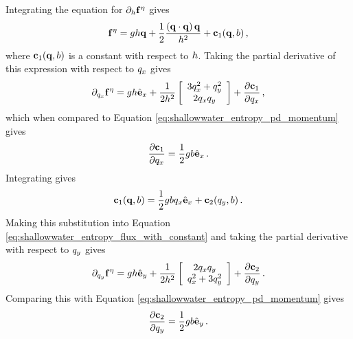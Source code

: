Integrating the equation for $\partial_h\mathbf{f}^\eta$
gives
\begin{equation}\label{eq:shallowwater_entropy_flux_with_constant}
  \mathbf{f}^\eta
  = gh\mathbf{q}
  + \frac{1}{2}\frac{\left(\mathbf{q}\cdot\mathbf{q}\right)\mathbf{q}} 
  {h^2}
  + \mathbf{c}_1(\mathbf{q}, b) \,,
\end{equation}
where $\mathbf{c}_1(\mathbf{q}, b)$ is a constant with respect
to $h$.  Taking the partial derivative of this expression with respect to
$q_x$ gives
\begin{equation}
  \partial_{q_x}\mathbf{f}^\eta
  = gh\hat{\mathbf{e}}_x
  + \frac{1}{2h^2}\left[\begin{array}{c}
      3q_x^2 + q_y^2\\
      2q_xq_y\\
    \end{array}\right]
  + \frac{\partial \mathbf{c}_1}{\partial q_x}
  \,,
\end{equation}
which when compared to Equation \eqref{eq:shallowwater_entropy_pd_momentum}
gives
\begin{equation}
  \frac{\partial \mathbf{c}_1}{\partial q_x}
  = \frac{1}{2}gb\hat{\mathbf{e}}_x
  \,.
\end{equation}
Integrating gives
\begin{equation}
  \mathbf{c}_1(\mathbf{q},b)
  = \frac{1}{2}gbq_x\hat{\mathbf{e}}_x
  + \mathbf{c}_2(q_y,b)
  \,.
\end{equation}
Making this substitution into Equation
\eqref{eq:shallowwater_entropy_flux_with_constant}
and taking the partial derivative with respect to $q_y$
gives
\begin{equation}
  \partial_{q_y}\mathbf{f}^\eta
  = gh\hat{\mathbf{e}}_y
  + \frac{1}{2h^2}\left[\begin{array}{c}
      2q_xq_y\\
      q_x^2 + 3q_y^2\\
    \end{array}\right]
  + \frac{\partial \mathbf{c}_2}{\partial q_y}
  \,.
\end{equation}
Comparing this with Equation \eqref{eq:shallowwater_entropy_pd_momentum}
gives
\begin{equation}
  \frac{\partial \mathbf{c}_2}{\partial q_y}
  = \frac{1}{2}gb\hat{\mathbf{e}}_y
  \,.
\end{equation}

